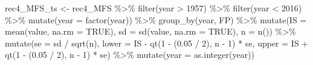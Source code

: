 \documentclass[
]{article}
\newenvironment{Shaded}{\begin{snugshade}}{\end{snugshade}}
\newcommand{\AttributeTok}[1]{\textcolor[rgb]{0.77,0.63,0.00}{#1}}
\newcommand{\ConstantTok}[1]{\textcolor[rgb]{0.00,0.00,0.00}{#1}}
\newcommand{\DecValTok}[1]{\textcolor[rgb]{0.00,0.00,0.81}{#1}}
\newcommand{\FloatTok}[1]{\textcolor[rgb]{0.00,0.00,0.81}{#1}}
\newcommand{\FunctionTok}[1]{\textcolor[rgb]{0.00,0.00,0.00}{#1}}
\newcommand{\NormalTok}[1]{#1}
\newcommand{\OtherTok}[1]{\textcolor[rgb]{0.56,0.35,0.01}{#1}}
\newcommand{\SpecialCharTok}[1]{\textcolor[rgb]{0.00,0.00,0.00}{#1}}
\begin{document}
\begin{Shaded}
\begin{Highlighting}[]
\NormalTok{rec4\_MFS\_ts }\OtherTok{\textless{}{-}}\NormalTok{ rec4\_MFS }\SpecialCharTok{\%\textgreater{}\%} 
  \FunctionTok{filter}\NormalTok{(year }\SpecialCharTok{\textgreater{}} \DecValTok{1957}\NormalTok{) }\SpecialCharTok{\%\textgreater{}\%}
  \FunctionTok{filter}\NormalTok{(year }\SpecialCharTok{\textless{}} \DecValTok{2016}\NormalTok{) }\SpecialCharTok{\%\textgreater{}\%} 
  \FunctionTok{mutate}\NormalTok{(}\AttributeTok{year =} \FunctionTok{factor}\NormalTok{(year)) }\SpecialCharTok{\%\textgreater{}\%} 
  \FunctionTok{group\_by}\NormalTok{(year, FP) }\SpecialCharTok{\%\textgreater{}\%} 
  \FunctionTok{mutate}\NormalTok{(}\AttributeTok{IS =} \FunctionTok{mean}\NormalTok{(value, }\AttributeTok{na.rm =} \ConstantTok{TRUE}\NormalTok{), }
            \AttributeTok{sd =} \FunctionTok{sd}\NormalTok{(value, }\AttributeTok{na.rm =} \ConstantTok{TRUE}\NormalTok{),}
            \AttributeTok{n =} \FunctionTok{n}\NormalTok{()) }\SpecialCharTok{\%\textgreater{}\%} 
  \FunctionTok{mutate}\NormalTok{(}\AttributeTok{se =}\NormalTok{ sd }\SpecialCharTok{/} \FunctionTok{sqrt}\NormalTok{(n),}
         \AttributeTok{lower =}\NormalTok{ IS }\SpecialCharTok{{-}} \FunctionTok{qt}\NormalTok{(}\DecValTok{1} \SpecialCharTok{{-}}\NormalTok{ (}\FloatTok{0.05} \SpecialCharTok{/} \DecValTok{2}\NormalTok{), n }\SpecialCharTok{{-}} \DecValTok{1}\NormalTok{) }\SpecialCharTok{*}\NormalTok{ se,}
         \AttributeTok{upper =}\NormalTok{ IS }\SpecialCharTok{+} \FunctionTok{qt}\NormalTok{(}\DecValTok{1} \SpecialCharTok{{-}}\NormalTok{ (}\FloatTok{0.05} \SpecialCharTok{/} \DecValTok{2}\NormalTok{), n }\SpecialCharTok{{-}} \DecValTok{1}\NormalTok{) }\SpecialCharTok{*}\NormalTok{ se) }\SpecialCharTok{\%\textgreater{}\%} 
  \FunctionTok{mutate}\NormalTok{(}\AttributeTok{year =} \FunctionTok{as.integer}\NormalTok{(year))}
  

\end{Highlighting}
\end{Shaded}
\end{document}
